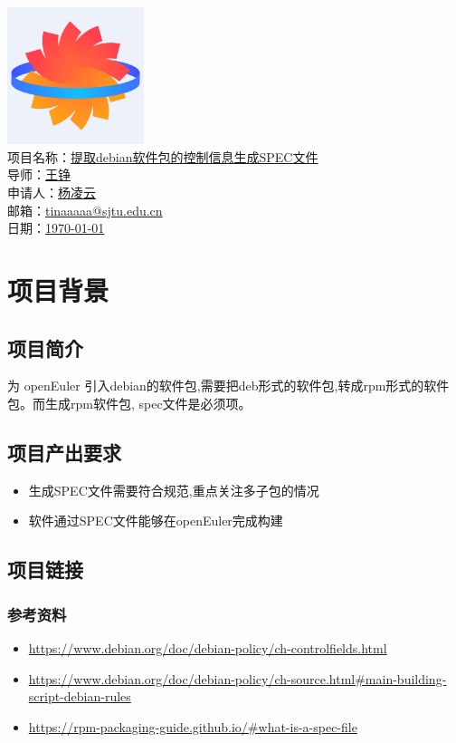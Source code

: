 \documentclass{article}
\begin{document}
\begin{center}
    \includegraphics[width=0.3\textwidth]{logo.png} \\
    项目名称：\underline{提取debian软件包的控制信息生成SPEC文件} \\
    导师：\underline{王铮}  \\
    申请人：\underline{杨凌云} \\
    邮箱：\underline{tinaaaaa@sjtu.edu.cn} \\
    日期：\underline{\today}
\end{center}
\tableofcontents
\newpage

\section{项目背景}
\subsection{项目简介}
为 openEuler 引入debian的软件包,需要把deb形式的软件包,转成rpm形式的软件包。而生成rpm软件包, spec文件是必须项。

\subsection{项目产出要求}
\begin{itemize}
    \item 生成SPEC文件需要符合规范,重点关注多子包的情况
    \item 软件通过SPEC文件能够在openEuler完成构建
\end{itemize}

\subsection{项目链接}
\subsubsection{参考资料}
\begin{itemize}
    \item \href{https://www.debian.org/doc/debian-policy/ch-controlfields.html}
    {https://www.debian.org/doc/debian-policy/ch-controlfields.html}
    \item \href{https://www.debian.org/doc/debian-policy/ch-source.html\#main-building-script-debian-rules}
    {https://www.debian.org/doc/debian-policy/ch-source.html\#main-building-script-debian-rules}
    \item \href{https://rpm-packaging-guide.github.io/\#what-is-a-spec-file}
    {https://rpm-packaging-guide.github.io/\#what-is-a-spec-file}
\end{itemize}
\end{document}

